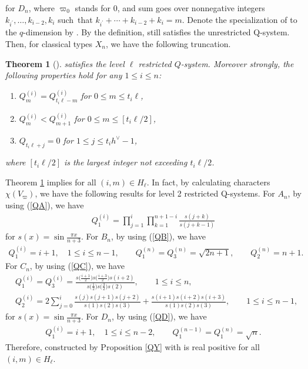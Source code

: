 \documentclass[10pt,a4paper]{amsart}
\numberwithin{equation}{section}
\newtheorem{Theorem}{Theorem}[section]
\begin{document}
for $D_n$, where $\varpi_0$ stands for 0, and sum goes over nonnegative integers $k_{i^\prime},\dots,k_{i-2},k_i$ such~that $k_{i^\prime}+\cdots+k_{i-2}+k_i=m$.
Denote the specialization of  to the $q$-dimension by .
By the definition,  still satisfies the unrestricted Q-system.
Then, for classical types $X_n$, we have the following truncation.
	\begin{Theorem}[{\cite{L,L2}}]\label{Qsol}
	 satisfies the level $\ell$ restricted $Q$-system.
	Moreover strongly, the following properties hold for any $1\leq i\leq n$:
			\begin{enumerate}\itemsep=0pt
			\item[$1)$] $Q_m^{(i)}=Q_{t_i\ell-m}^{(i)}$ for $0\leq m\leq t_i\ell$,
			\item[$2)$] $Q_m^{(i)}<Q_{m+1}^{(i)}$ for $0\leq m\leq[t_i\ell/2]$,
			\item[$3)$] $Q_{t_i\ell+j}=0$ for $1\leq j\leq t_ih^\vee-1$,
			\end{enumerate}
	where $[t_i\ell/2]$ is the largest integer not exceeding $t_i\ell/2$.
	\end{Theorem}
Theorem \ref{Qsol} implies  for all $(i,m)\in H_\ell$.
In fact, by calculating characters $\chi(V_{\varpi})$, we have the following results for level 2 restricted Q-systems.
For $A_n$, by using (\ref{QA}), we have
	\begin{align*}%
	Q_1^{(i)}=\prod_{j=1}^i\prod_{k=1}^{n+1-i}\frac{s(j+k)}{s(j+k-1)}
	\end{align*}
for $s(x)=\sin{\frac{\pi x}{n+3}}$.
For $B_n$, by using (\ref{QB}), we have
	\begin{align}\label{SQB}
	Q_1^{(i)}=i+1,\quad 1\leq i\leq n-1,\qquad Q_1^{(n)}=Q_3^{(n)}=\sqrt{2n+1},\qquad Q_2^{(n)}=n+1.
	\end{align}
For $C_n$, by using (\ref{QC}), we have
	\begin{align}\label{SQC}
	&Q_1^{(i)}=Q_3^{(i)}=\frac{s\bigl(\frac{i+1}{2}\bigr)s\bigl(\frac{i+3}{2}\bigr)s(i+2)}{s\bigl(\frac{1}{2}\bigr)s\bigl(\frac{3}{2}\bigr)s(2)},\qquad 1\leq i\leq n ,\\
	\label{SQC2}
	&Q_2^{(i)}=2\sum_{j=0}^i\frac{s(j)s(j+1)s(j+2)}{s(1)s(2)s(3)}+\frac{s(i+1)s(i+2)s(i+3)}{s(1)s(2)s(3)},\qquad 1\leq i\leq n-1,
	\end{align}
for $s(x)=\sin{\frac{\pi x}{n+3}}$.
For $D_n$, by using (\ref{QD}), we have
	\begin{align}\label{SQD}
	Q_1^{(i)}=i+1,\quad 1\leq i\leq n-2 ,\qquad Q_1^{(n-1)}=Q_1^{(n)}=\sqrt{n}.
	\end{align}
Therefore,  constructed by Proposition \ref{QY} with  is real positive for all~$(i,m)\in H_\ell$.
\end{document}
